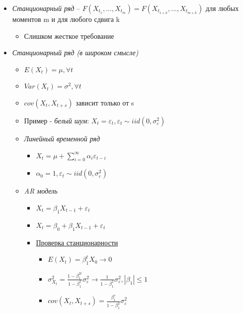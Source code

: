 \documentclass[a4paper, 12pt]{article}
\begin{document}
\begin{itemize}
    \item \textit{Станционарный ряд} -- $F(X_{t_{1}}, ..., X_{t_{m}}) = F(X_{t_{1+k}}, ..., X_{t_{m+k}})$ для любых моментов m и для любого сдвига k
    \begin{itemize}
        \item Слишком жесткое требование
    \end{itemize}
    \item \textit{Станционарный ряд (в широком смысле)}
    \begin{itemize}
        \item $E(X_{t}) = \mu, \forall t$
        \item $Var(X_{t}) = \sigma^{2}, \forall t$
        \item $cov(X_{t}, X_{t+s})$ зависит только от s
        \item Пример - \textit{белый шум}: $X_{t} = \varepsilon_{t}, \varepsilon_{t} \sim iid(0, \sigma_{\varepsilon}^{2})$
        \item \textit{Линейный временной ряд}
        \begin{itemize}
            \item $X_{t} = \mu + \sum_{i = 0}^{\infty}\alpha_{i}\varepsilon_{t - i}$
            \item $\alpha_{0} = 1, \varepsilon_{t} \sim iid(0, \sigma_{\varepsilon}^{2})$
        \end{itemize}
        \item \textit{AR модель}
        \begin{itemize}
            \item $X_{t} = \beta_{1}X_{t-1} + \varepsilon_{t}$
            \item $X_{t} = \beta_{0} + \beta_{1}X_{t-1} + \varepsilon_{t}$
            \item \underline{Проверка станционарности}
            \begin{itemize}
                \item $E(X_{t}) = \beta_{1}^{t}X_{0} \rightarrow 0$
                \item $\sigma_{X_{t}}^{2} = \frac{1 - \beta_{1}^{2t}}{1 - \beta_{1}^{2}}\sigma_{\varepsilon}^{2} \rightarrow \frac{1}{1 - \beta_{1}^{2}}\sigma_{\varepsilon}^{2}, |\beta_{1}| \leq 1$
                \item $cov(X_{t}, X_{t+s}) = \frac{\beta_{1}^{s}}{1 - \beta_{1}^{2}}\sigma_{\varepsilon}^{2}$
            \end{itemize}
        \end{itemize}

\end{itemize}
\end{itemize}
\end{document}
